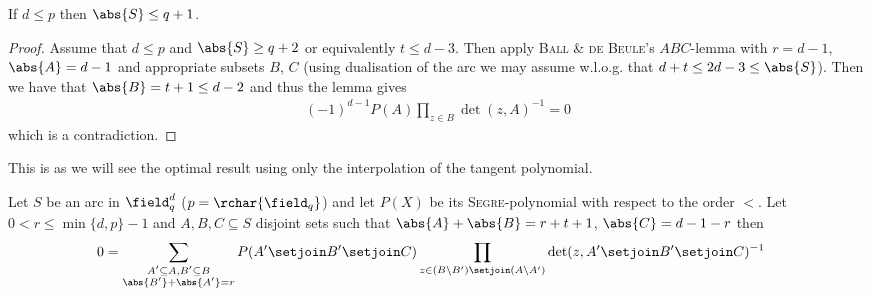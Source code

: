 \message{ !name(OnTheRAIDProblem.tex)}\documentclass[8pt,a4paper]{article}
\begin{document}
\begin{corollary}
If $d\leq p$ then $\abs{S}\leq q+1$.
\end{corollary}

\begin{proof}
Assume that $d\leq p$ and $\abs{S}\geq q+2$ or equivalently $t\leq
d-3$. Then apply \textsc{Ball \& de Beule}'s $ABC$-lemma with $r=d-1$,
$\abs{A}=d-1$ and appropriate subsets $B$, $C$ (using dualisation of
the arc we may assume w.l.o.g. that $d+t\leq 2d-3\leq\abs{S}$). Then
we have that $\abs{B}=t+1\leq d-2$ and thus the lemma gives
\begin{align*}
(-1)^{d-1}P(A)\prod_{z\in B}{\det(z,A)^{-1}}=0
\end{align*}
which is a contradiction.
\end{proof}

\begin{remark}
This is as we will see the optimal result using only the interpolation
of the tangent polynomial.
\end{remark}

\begin{lemma} 
Let $S$ be an arc in $\field_q^d$ ($p=\rchar{\field_q}$) and let
$P(X)$ be its \textsc{Segre}-polynomial with respect to the order
$<$. Let $0<r\leq\min\{d,p\}-1$ and $A,B,C\subseteq S$ disjoint sets
such that $\abs{A}+\abs{B}=r+t+1$, $\abs{C}=d-1-r$ then
\begin{align}
0 &= \sum_{\substack{A'\subseteq A, B'\subseteq B\\
     \abs{B'}+\abs{A'}=r}}{P(A'\setjoin B'\setjoin C)\prod_{z\in
     (B\setminus B')\setjoin (A\setminus A')}{\det(z,A'\setjoin B'\setjoin C)^{-1}}}
\end{align}
\end{lemma}
\end{document}

